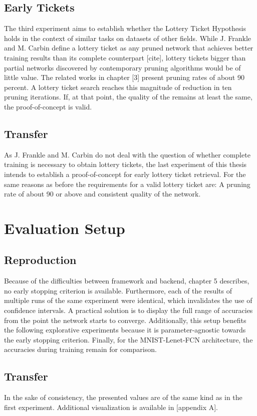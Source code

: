 \subsection*{Early Tickets}
The third experiment aims to establish whether the Lottery Ticket Hypothesis holds in the context of similar tasks on datasets of other fields. While J. Frankle and M. Carbin define a lottery ticket as any pruned network that achieves better training results than its complete counterpart [cite], lottery tickets bigger than partial networks discovered by contemporary pruning algorithms would be of little value. The related works in chapter [3] present pruning rates of about 90 percent. A lottery ticket search reaches this magnitude of reduction in ten pruning iterations. If, at that point, the quality of the remains at least the same, the proof-of-concept is valid.
\subsection*{Transfer}
As J. Frankle and M. Carbin do not deal with the question of whether complete training is necessary to obtain lottery tickets, the last experiment of this thesis intends to establish a proof-of-concept for early lottery ticket retrieval. For the same reasons as before the requirements for a valid lottery ticket are: 
A pruning rate of about 90 or above and consistent quality of the network.

\section{Evaluation Setup}
\subsection*{Reproduction}
Because of the difficulties between framework and backend, chapter 5 describes, no early stopping criterion is available. Furthermore, each of the results of multiple runs of the same experiment were identical, which invalidates the use of confidence intervals. A practical solution is to display the full range of accuracies from the point the network starts to converge. Additionally, this setup benefits the following explorative experiments because it is parameter-agnostic towards the early stopping criterion. Finally, for the MNIST-Lenet-FCN architecture, the accuracies during training remain for comparison.
\subsection*{Transfer}
In the sake of consistency, the presented values are of the same kind as in the first experiment. Additional visualization is available in [appendix A].
